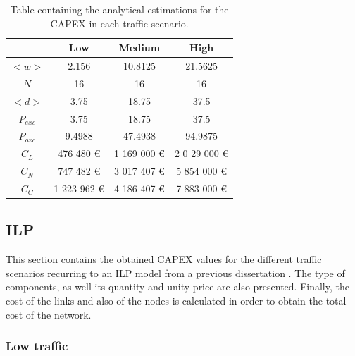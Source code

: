 \begin{table}[H]
\centering
\begin{tabular}{|c|c|c|c|}
\hline
 & \textbf{Low} & \textbf{Medium} & \textbf{High} \\ \hline
$<w>$ & 2.156 & 10.8125 & 21.5625 \\ \hline
$N$ & 16 & 16 & 16 \\ \hline
$<d>$ & 3.75 & 18.75 & 37.5 \\ \hline
$P_{exc}$ & 3.75 & 18.75 & 37.5 \\ \hline
$P_{oxc}$ & 9.4988 & 47.4938 & 94.9875 \\ \hline
$C_{L}$ & 476 480 \euro & 1 169 000 \euro & 2 0 29 000 \euro \\ \hline
$C_{N}$ & 747 482 \euro & 3 017 407 \euro & 5 854 000 \euro \\ \hline
$C_{C}$ & 1 223 962 \euro & 4 186 407 \euro & 7 883 000 \euro \\ \hline
\end{tabular}
\caption{Table containing the analytical estimations for the CAPEX in each traffic scenario.}
\label{analComparison}
\end{table}

\subsection{ILP}

This section contains the obtained CAPEX values for the different traffic scenarios recurring to an ILP model from a previous dissertation \cite{TiagoEsteves}. The type of components, as well its quantity and unity price are also presented. Finally, the cost of the links and also of the nodes is calculated in order to obtain the total cost of the network.

\subsubsection{Low traffic}

